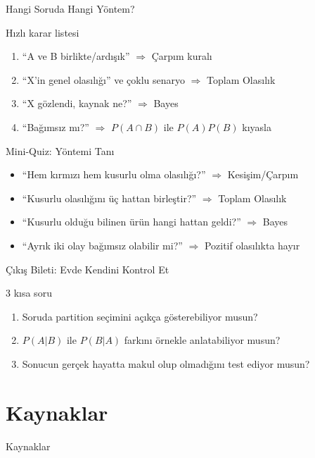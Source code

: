 \documentclass[light]{lutbeamer}
\begin{document}
\begin{frame}{Hangi Soruda Hangi Yöntem?}
    \begin{block}{Hızlı karar listesi}
        \begin{enumerate}
            \item ``A ve B birlikte/ardışık'' \(\Rightarrow\) Çarpım kuralı
            \item ``X'in genel olasılığı'' ve çoklu senaryo \(\Rightarrow\) Toplam Olasılık
            \item ``X gözlendi, kaynak ne?'' \(\Rightarrow\) Bayes
            \item ``Bağımsız mı?'' \(\Rightarrow\) \(P(A\cap B)\) ile \(P(A)P(B)\) kıyasla
        \end{enumerate}
    \end{block}
\end{frame}

\begin{frame}[fragile]{Mini-Quiz: Yöntemi Tanı}
    \begin{itemize}[<+->]
        \item ``Hem kırmızı hem kusurlu olma olasılığı?'' \(\Rightarrow\) Kesişim/Çarpım
        \item ``Kusurlu olasılığını üç hattan birleştir?'' \(\Rightarrow\) Toplam Olasılık
        \item ``Kusurlu olduğu bilinen ürün hangi hattan geldi?'' \(\Rightarrow\) Bayes
        \item ``Ayrık iki olay bağımsız olabilir mi?'' \(\Rightarrow\) Pozitif olasılıkta hayır
    \end{itemize}
\end{frame}

\begin{frame}{Çıkış Bileti: Evde Kendini Kontrol Et}
    \begin{block}{3 kısa soru}
        \begin{enumerate}
            \item Soruda partition seçimini açıkça gösterebiliyor musun?
            \item \(P(A|B)\) ile \(P(B|A)\) farkını örnekle anlatabiliyor musun?
            \item Sonucun gerçek hayatta makul olup olmadığını test ediyor musun?
        \end{enumerate}
    \end{block}
\end{frame}

\section{Kaynaklar}
\begin{frame}[allowframebreaks]{Kaynaklar}
    \nocite{*}
    \printbibliography{}
\end{frame}
\end{document}
